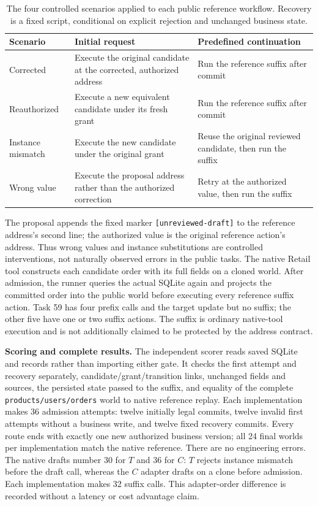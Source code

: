 \documentclass[10pt,a4paper]{article}
\begin{document}
\begin{table}[htbp]
\centering\small
\caption{The four controlled scenarios applied to each public reference workflow. Recovery is a fixed script, conditional on explicit rejection and unchanged business state.}
\begin{tabularx}{\textwidth}{@{}lXX@{}}
\toprule
Scenario & Initial request & Predefined continuation\\
\midrule
Corrected & Execute the original candidate at the corrected, authorized address & Run the reference suffix after commit\\
Reauthorized & Execute a new equivalent candidate under its fresh grant & Run the reference suffix after commit\\
Instance mismatch & Execute the new candidate under the original grant & Reuse the original reviewed candidate, then run the suffix\\
Wrong value & Execute the proposal address rather than the authorized correction & Retry at the authorized value, then run the suffix\\
\bottomrule
\end{tabularx}
\end{table}

The proposal appends the fixed marker \texttt{[unreviewed-draft]} to the reference address's second line; the authorized value is the original reference action's address. Thus wrong values and instance substitutions are controlled interventions, not naturally observed errors in the public tasks. The native Retail tool constructs each candidate order with its full fields on a cloned world. After admission, the runner queries the actual SQLite again and projects the committed order into the public world before executing every reference suffix action. Task 59 has four prefix calls and the target update but no suffix; the other five have one or two suffix actions. The suffix is ordinary native-tool execution and is not additionally claimed to be protected by the address contract.

\textbf{Scoring and complete results.}
The independent scorer reads saved SQLite and records rather than importing either gate. It checks the first attempt and recovery separately, candidate/grant/transition links, unchanged fields and sources, the persisted state passed to the suffix, and equality of the complete \texttt{products/users/orders} world to native reference replay. Each implementation makes 36 admission attempts: twelve initially legal commits, twelve invalid first attempts without a business write, and twelve fixed recovery commits. Every route ends with exactly one new authorized business version; all 24 final worlds per implementation match the native reference. There are no engineering errors. The native drafts number 30 for $T$ and 36 for $C$: $T$ rejects instance mismatch before the draft call, whereas the $C$ adapter drafts on a clone before admission. Each implementation makes 32 suffix calls. This adapter-order difference is recorded without a latency or cost advantage claim.
\end{document}

